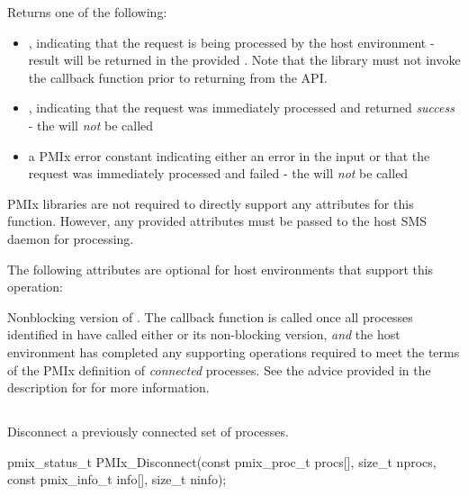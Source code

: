 Returns one of the following:

\begin{itemize}
    \item {}, indicating that the request is being processed by the host environment - result will be returned in the provided . Note that the library must not invoke the callback function prior to returning from the \ac{API}.
    \item {}, indicating that the request was immediately processed and returned \textit{success} - the  will \textit{not} be called
    \item a PMIx error constant indicating either an error in the input or that the request was immediately processed and failed - the  will \textit{not} be called
\end{itemize}


\reqattrstart
\ac{PMIx} libraries are not required to directly support any attributes for this function. However, any provided attributes must be passed to the host \ac{SMS} daemon for processing.

\reqattrend

\optattrstart
The following attributes are optional for host environments that support this operation:


\optattrend

\descr

Nonblocking version of . The callback function is called once all processes identified in  have called either  or its non-blocking version, \textit{and} the host environment has completed any supporting operations required to meet the terms of the \ac{PMIx} definition of \textit{connected} processes. See the advice provided in the description for  for more information.


\subsection{}

\summary

Disconnect a previously connected set of processes.

\format

\cspecificstart
\begin{codepar}
pmix_status_t
PMIx_Disconnect(const pmix_proc_t procs[], size_t nprocs,
                const pmix_info_t info[], size_t ninfo);
\end{codepar}
\cspecificend

